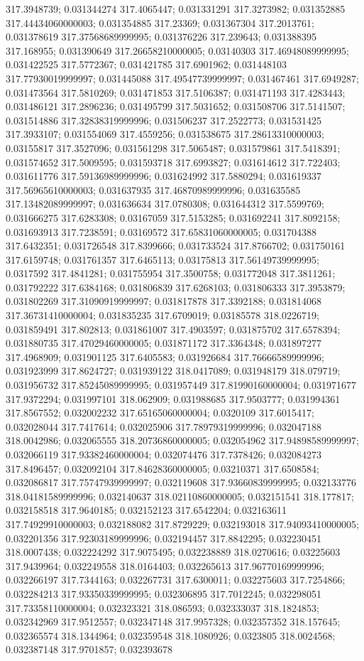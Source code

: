 317.3948739; 0.031344274 317.4065447; 0.031331291 317.3273982; 0.031352885 317.44434060000003; 0.031354885 317.23369; 0.031367304 317.2013761; 0.031378619 317.37568689999995; 0.031376226 317.239643; 0.031388395 317.168955; 0.031390649 317.26658210000005; 0.03140303 317.46948089999995; 0.031422525 317.5772367; 0.031421785 317.6901962; 0.031448103 317.77930019999997; 0.031445088 317.49547739999997; 0.031467461 317.6949287; 0.031473564 317.5810269; 0.031471853 317.5106387; 0.031471193 317.4283443; 0.031486121 317.2896236; 0.031495799 317.5031652; 0.031508706 317.5141507; 0.031514886 317.32838319999996; 0.031506237 317.2522773; 0.031531425 317.3933107; 0.031554069 317.4559256; 0.031538675 317.28613310000003; 0.03155817 317.3527096; 0.031561298 317.5065487; 0.031579861 317.5418391; 0.031574652 317.5009595; 0.031593718 317.6993827; 0.031614612 317.722403; 0.031611776 317.59136989999996; 0.031624992 317.5880294; 0.031619337 317.56965610000003; 0.031637935 317.46870989999996; 0.031635585 317.13482089999997; 0.031636634 317.0780308; 0.031644312 317.5599769; 0.031666275 317.6283308; 0.03167059 317.5153285; 0.031692241 317.8092158; 0.031693913 317.7238591; 0.03169572 317.65831060000005; 0.031704388 317.6432351; 0.031726548 317.8399666; 0.031733524 317.8766702; 0.031750161 317.6159748; 0.031761357 317.6465113; 0.03175813 317.56149739999995; 0.0317592 317.4841281; 0.031755954 317.3500758; 0.031772048 317.3811261; 0.031792222 317.6384168; 0.031806839 317.6268103; 0.031806333 317.3953879; 0.031802269 317.31090919999997; 0.031817878 317.3392188; 0.031814068 317.36731410000004; 0.031835235 317.6709019; 0.03185578 318.0226719; 0.031859491 317.802813; 0.031861007 317.4903597; 0.031875702 317.6578394; 0.031880735 317.47029460000005; 0.031871172 317.3364348; 0.031897277 317.4968909; 0.031901125 317.6405583; 0.031926684 317.76666589999996; 0.031923999 317.8624727; 0.031939122 318.0417089; 0.031948179 318.079719; 0.031956732 317.85245089999995; 0.031957449 317.81990160000004; 0.031971677 317.9372294; 0.031997101 318.062909; 0.031988685 317.9503777; 0.031994361 317.8567552; 0.032002232 317.65165060000004; 0.0320109 317.6015417; 0.032028044 317.7417614; 0.032025906 317.78979319999996; 0.032047188 318.0042986; 0.032065555 318.20736860000005; 0.032054962 317.94898589999997; 0.032066119 317.93382460000004; 0.032074476 317.7378426; 0.032084273 317.8496457; 0.032092104 317.84628360000005; 0.03210371 317.6508584; 0.032086817 317.75747939999997; 0.032119608 317.93660839999995; 0.032133776 318.04181589999996; 0.032140637 318.02110860000005; 0.032151541 318.177817; 0.032158518 317.9640185; 0.032152123 317.6542204; 0.032163611 317.74929910000003; 0.032188082 317.8729229; 0.032193018 317.94093410000005; 0.032201356 317.92303189999996; 0.032194457 317.8842295; 0.032230451 318.0007438; 0.032224292 317.9075495; 0.032238889 318.0270616; 0.03225603 317.9439964; 0.032249558 318.0164403; 0.032265613 317.96770169999996; 0.032266197 317.7344163; 0.032267731 317.6300011; 0.032275603 317.7254866; 0.032284213 317.93350339999995; 0.032306895 317.7012245; 0.032298051 317.73358110000004; 0.032323321 318.086593; 0.032333037 318.1824853; 0.032342969 317.9512557; 0.032347148 317.9957328; 0.032357352 318.157645; 0.032365574 318.1344964; 0.032359548 318.1080926; 0.0323805 318.0024568; 0.032387148 317.9701857; 0.032393678 